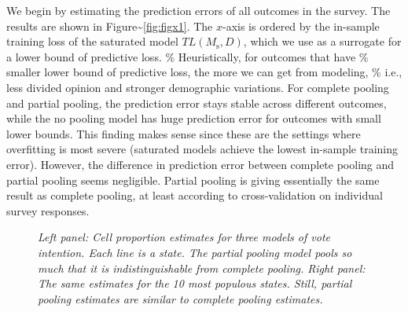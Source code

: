 \documentclass[11pt,article,oneside]{memoir}
\begin{document}
We begin by estimating the prediction errors of all outcomes in the
survey. The results are shown in Figure\textasciitilde{}\ref{fig:figx1}.
The \(x\)-axis is ordered by the in-sample training loss of the
saturated model \(TL(M_{\text{s}},D)\), which we use as a surrogate for
a lower bound of predictive loss. \% Heuristically, for outcomes that
have \% smaller lower bound of predictive loss, the more we can get from
modeling, \% i.e., less divided opinion and stronger demographic
variations. For complete pooling and partial pooling, the prediction
error stays stable across different outcomes, while the no pooling model
has huge prediction error for outcomes with small lower bounds. This
finding makes sense since these are the settings where overfitting is
most severe (saturated models achieve the lowest in-sample training
error). However, the difference in prediction error between complete
pooling and partial pooling seems negligible. Partial pooling is giving
essentially the same result as complete pooling, at least according to
cross-validation on individual survey responses.

\begin{figure}
  \centering
  \caption{\em Left panel: Cell proportion estimates for three models of vote
    intention. Each line is a state. The
    partial pooling model pools so much that it is indistinguishable from
    complete pooling. Right panel: The same estimates for the 10 most populous
    states. Still, partial pooling estimates are similar to complete pooling
    estimates.}
  \label{fig:234}
\end{figure}
\end{document}
